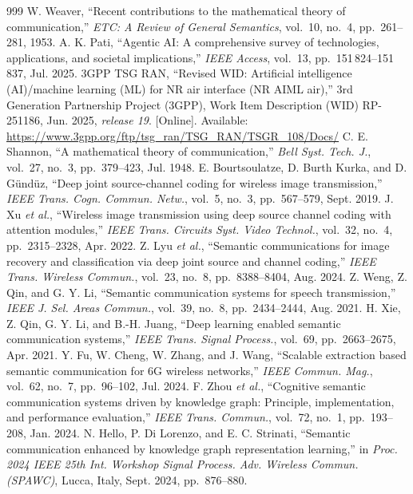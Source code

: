\begin{thebibliography}{999}
\small
{} W. Weaver, ``Recent contributions to the mathematical theory of communication,'' \emph{ETC: A Review of General Semantics}, vol.~10, no.~4, pp.~261--281, 1953.
 A. K. Pati, ``Agentic AI: A comprehensive survey of technologies, applications, and societal implications,'' \emph{IEEE Access}, vol.~13, pp.~151\,824--151\,837, Jul. 2025.
 3GPP TSG RAN, ``Revised WID: Artificial intelligence (AI)/machine learning (ML) for NR air interface (NR AIML air),'' 3rd Generation Partnership Project (3GPP), Work Item Description (WID) RP-251186, Jun. 2025, \emph{release 19}. [Online]. Available: \url{https://www.3gpp.org/ftp/tsg_ran/TSG_RAN/TSGR_108/Docs/}
 C. E. Shannon, ``A mathematical theory of communication,'' \emph{Bell Syst. Tech. J.}, vol.~27, no.~3, pp.~379--423, Jul. 1948.
 E. Bourtsoulatze, D. Burth Kurka, and D. Gündüz, ``Deep joint source-channel coding for wireless image transmission,'' \emph{IEEE Trans. Cogn. Commun. Netw.}, vol.~5, no.~3, pp.~567--579, Sept. 2019.
 J. Xu \emph{et al.}, ``Wireless image transmission using deep source channel coding with attention modules,'' \emph{IEEE Trans. Circuits Syst. Video Technol.}, vol.~32, no.~4, pp.~2315--2328, Apr. 2022.
 Z. Lyu \emph{et al.}, ``Semantic communications for image recovery and classification via deep joint source and channel coding,'' \emph{IEEE Trans. Wireless Commun.}, vol.~23, no.~8, pp.~8388--8404, Aug. 2024.
 Z. Weng, Z. Qin, and G. Y. Li, ``Semantic communication systems for speech transmission,'' \emph{IEEE J. Sel. Areas Commun.}, vol.~39, no.~8, pp.~2434--2444, Aug. 2021.
 H. Xie, Z. Qin, G. Y. Li, and B.-H. Juang, ``Deep learning enabled semantic communication systems,'' \emph{IEEE Trans. Signal Process.}, vol.~69, pp.~2663--2675, Apr. 2021.
 Y. Fu, W. Cheng, W. Zhang, and J. Wang, ``Scalable extraction based semantic communication for 6G wireless networks,'' \emph{IEEE Commun. Mag.}, vol.~62, no.~7, pp.~96--102, Jul. 2024.
 F. Zhou \emph{et al.}, ``Cognitive semantic communication systems driven by knowledge graph: Principle, implementation, and performance evaluation,'' \emph{IEEE Trans. Commun.}, vol.~72, no.~1, pp.~193--208, Jan. 2024.
 N. Hello, P. Di Lorenzo, and E. C. Strinati, ``Semantic communication enhanced by knowledge graph representation learning,'' in \emph{Proc. 2024 IEEE 25th Int. Workshop Signal Process. Adv. Wireless Commun. (SPAWC)}, Lucca, Italy, Sept. 2024, pp.~876--880.

\end{thebibliography}
